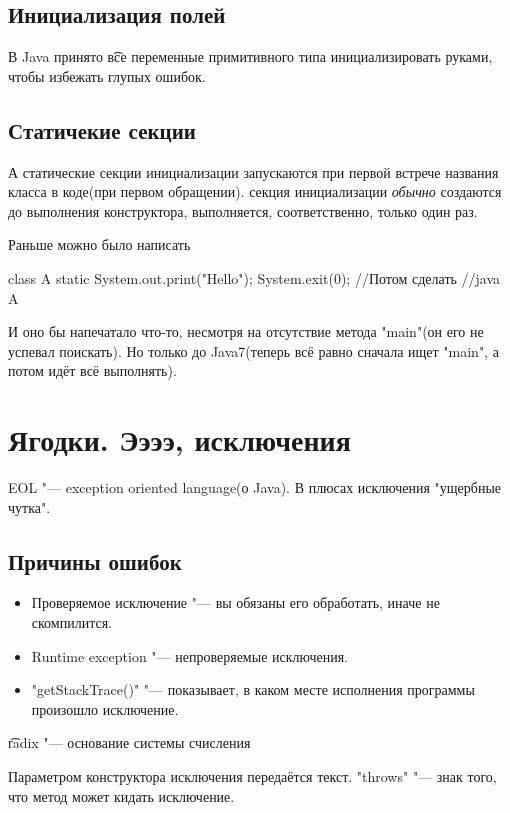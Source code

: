 \subsection{Инициализация полей}
В Java принято \t{все} переменные примитивного типа инициализировать руками, чтобы избежать глупых ошибок.

\subsection{Статичекие секции}
А статические секции инициализации запускаются при первой встрече названия класса в коде(при первом обращении).
секция инициализации \textit{обычно} создаются до выполнения конструктора, выполняется, соответственно, только один раз.

Раньше можно было написать
\begin{javacode}
class A {
	static {
		System.out.print("Hello");
		System.exit(0);
	}
}
//Потом сделать
//java A
\end{javacode}


И оно бы напечатало что-то, несмотря на отсутствие метода \java"main"(он его не успевал поискать).
Но только до Java7(теперь всё равно сначала ищет \java"main", а потом идёт всё выполнять).

\section{Ягодки. Ээээ, исключения}
EOL "--- exception oriented language(о Java).
В плюсах исключения "ущербные чутка".

\subsection{Причины ошибок}
\begin{itemize}
	\item
		Проверяемое исключение "--- вы обязаны его обработать, иначе не скомпилится.
	\item
		Runtime exception "--- непроверяемые исключения.
	\item
		\java"getStackTrace()" "--- показывает, в каком месте исполнения программы произошло исключение.
\end{itemize}

\t{radix} "--- основание системы счисления

Параметром конструктора исключения передаётся текст.
\java"throws" "--- знак того, что метод может кидать исключение.



